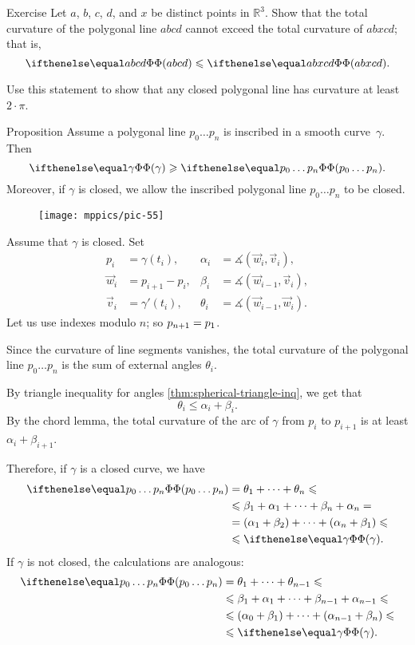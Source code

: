\begin{thm}{Exercise}\label{ex:monotonic-tc}
Let $a$, $b$, $c$, $d$, and $x$ be distinct points in $\mathbb{R}^3$.
Show that the total curvature of the polygonal line $abcd$ cannot exceed the total curvature of $abxcd$; that is, 
\[\tc {abcd} \le \tc {abxcd}.\]

Use this statement to show that any closed polygonal line has curvature at least $2\cdot\pi$.
\end{thm}



\begin{thm}{Proposition}\label{prop:inscribed-total-curvature}
Assume a polygonal line $p_0\dots p_n$ is inscribed in a smooth curve~$\gamma$.
Then 
\[\tc\gamma\ge \tc{p_0\dots p_n}.\]
Moreover, if $\gamma$ is closed, we allow the inscribed polygonal line $p_0\dots p_n$ to be closed.

\end{thm}

{

\begin{wrapfigure}[7]{o}{40 mm}
\vskip-8mm
\centering
\texttt{[image: mppics/pic-55]}
\vskip0mm
\end{wrapfigure}

Assume that $\gamma$ is closed.
Set 
\begin{align*}
p_i&=\gamma(t_i),
&
\alpha_i&=\measuredangle(\vec w_i,\vec v_i),
\\
\vec w_i&=p_{i+1}-p_i,
& 
\beta_i&=\measuredangle(\vec w_{i-1},\vec v_i),
\\
\vec v_i&=\gamma'(t_i),
&
\theta_i&=\measuredangle(\vec w_{i-1},\vec w_i).
\end{align*}
Let us use indexes modulo $n$;
so $p_{n+1}\z=p_1$.

}

Since the curvature of line segments vanishes, 
the total curvature of the polygonal line $p_0\dots p_n$ is the sum of external angles $\theta_i$.

By triangle inequality for angles \ref{thm:spherical-triangle-inq}, we get that
\[\theta_i\le \alpha_i+\beta_i.\]
By the chord lemma, the total curvature of the arc of $\gamma$ from $p_i$ to $p_{i+1}$ is at least $\alpha_i+\beta_{i+1}$. 

Therefore, if $\gamma$ is a closed curve, we have
\begin{align*}
\tc{p_0\dots p_n}&=\theta_1+\dots+\theta_n\le 
\\
&\le\beta_1+\alpha_1+\dots+\beta_n+\alpha_n = 
\\
&=(\alpha_1+\beta_2)+\dots+(\alpha_n+\beta_1) \le 
\\
&\le \tc\gamma.
\end{align*}
If $\gamma$ is not closed, the calculations are analogous:
\begin{align*}
\tc{p_0\dots p_n}&=\theta_1+\dots+\theta_{n-1}\le 
\\
&\le\beta_1+\alpha_1+\dots+\beta_{n-1}+\alpha_{n-1} \le
\\
&\le (\alpha_0+\beta_1)+\dots+(\alpha_{n-1}+\beta_n) \le 
\\
&\le \tc\gamma.
\end{align*}
\qedsf

